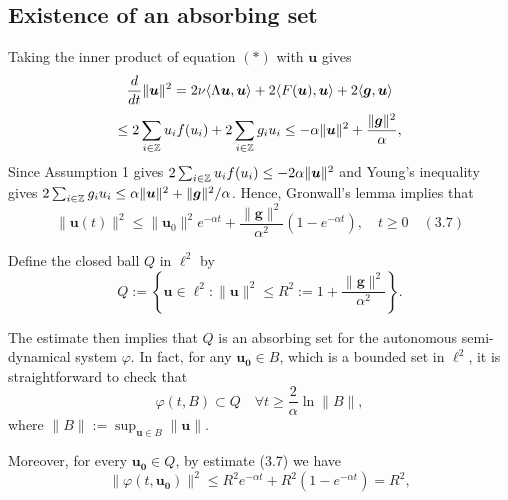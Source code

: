 \documentclass[11pt]{beamer}
\begin{document}
\subsection{ Existence of an absorbing set}
\begin{frame}
    Taking the inner product of equation \((*)\) with $\boldsymbol{u}$ gives
    \[
    \frac{d}{dt} \|\boldsymbol{u}\|^2 = 2\mathnormal{\nu} \langle \Lambda \boldsymbol{u}, \boldsymbol{u} \rangle + 2 \langle \mathnormal{F}(\boldsymbol{u}), \boldsymbol{u} \rangle + 2 \langle \boldsymbol{g}, \boldsymbol{u} \rangle
    \]
    \[
    \leq 2 \sum_{i \in \mathbb{Z}} \mathnormal{u_i} \mathnormal{f(u_i)} + 2 \sum_{i \in \mathbb{Z}} \mathnormal{g_i} \mathnormal{u_i} \leq -\alpha \|\boldsymbol{u}\|^2 + \frac{\|\boldsymbol{g}\|^2}{\alpha},
    \]
    Since Assumption 1 gives \(2\sum_{i\in\mathbb{Z}}\mathnormal{u_i} f(u_i) \leq -2\alpha\|\boldsymbol{u}\|^2\)
    and Young's inequality gives \(2\sum_{i\in\mathbb{Z}}\mathnormal{g_i u_i}\leq\alpha\|\boldsymbol{u}\|^2+\|\boldsymbol{g}\|^2/\alpha\). Hence, Gronwall's lemma implies that
    \[
    \|\boldsymbol{u}(t)\|^2 \leq \|\boldsymbol{u}_0\|^2 e^{-\alpha t} + \frac{\|\boldsymbol{g}\|^2}{\alpha^2} \left(1 - e^{-\alpha t}\right), \quad t \geq 0 \quad (3.7)
    \]
    
    Define the closed ball $Q$ in $\ell^2$ by
    \[
    Q := \left\{ \boldsymbol{u} \in \ell^2 : \|\boldsymbol{u}\|^2 \leq R^2 := 1 + \frac{\|\boldsymbol{g}\|^2}{\alpha^2} \right\}.
    \]
    
\end{frame}

\begin{frame}
    The estimate then implies that $Q$ is an absorbing set for the autonomous semi-dynamical system $\varphi$. In fact, for any $\boldsymbol{u_0} \in B$, which is a bounded set in $\ell^2$, it is straightforward to check that
\[
\varphi(t, B) \subset Q \quad \forall t \geq \frac{2}{\alpha} \ln \|B\|,
\]
where $\|B\| := \sup_{\boldsymbol{u} \in B} \|\boldsymbol{u}\|$.

Moreover, for every $\boldsymbol{u_0} \in Q$, by estimate (3.7) we have
\[
\|\varphi(t, \boldsymbol{u_0})\|^2 \leq R^2 e^{-\alpha t} + R^2 (1 - e^{-\alpha t}) = R^2,
\]
 
\end{frame}
\end{document}
